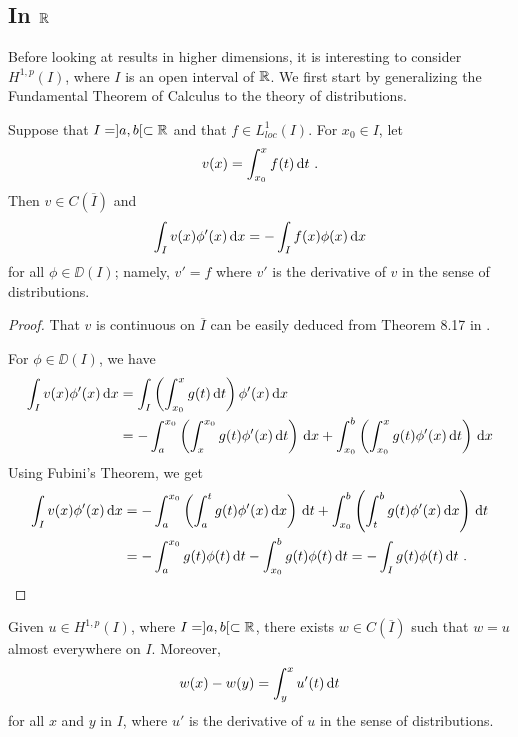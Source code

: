 \subsection{In $\mathbf{\mathbb{R}}$}

Before looking at results in higher dimensions, it is interesting to
consider $\displaystyle H^{1,p}(I)$, where $I$ is an open interval
of $\mathbb{R}$.  We first start by generalizing the
Fundamental Theorem of Calculus to the theory of distributions.

\begin{lemma} \label{sob_ftc}
Suppose that $I = ]a,b[ \subset \mathbb{R}$ and that
$\displaystyle f \in L^1_{loc}(I)$.  For $x_0 \in I$, let
\[
v(x) = \int_{x_0}^x f(t) \dx{t} \ .
\]
Then $v \in C(\overline{I})$ and
\[
\int_I v(x) \phi'(x) \,\mathrm{d}{x} = - \int _I f(x) \phi(x) \,\mathrm{d}{x}
\]
for all $\phi \in \DD(I)$; namely, $v' = f$ where $v'$ is the
derivative of $v$ in the sense of distributions.
\end{lemma}

\begin{proof}
That $v$ is continuous on $\overline{I}$ can be easily deduced from
Theorem 8.17 in \cite{Ru}.

For $\phi \in \DD(I)$, we have
\begin{align*}
\int_I v(x) \phi'(x) \,\mathrm{d}{x} &= \int_I \left( \int_{x_0}^x g(t)
  \,\mathrm{d}{t} \right) \phi'(x) \,\mathrm{d}{x} \\
&= -\int_a^{x_0} \left( \int_x^{x_0} g(t) \phi'(x) \,\mathrm{d}{t}\right) \,\mathrm{d}{x}
+ \int_{x_0}^b \left( \int_{x_0}^x g(t) \phi'(x) \,\mathrm{d}{t}\right) \,\mathrm{d}{x}
\end{align*}
Using Fubini's Theorem, we get
\begin{align*}
\int_I v(x) \phi'(x) \dx{x} &=
-\int_a^{x_0} \left( \int_a^t g(t) \phi'(x) \dx{x}\right) \dx{t}
+ \int_{x_0}^b \left( \int_t^b g(t) \phi'(x) \dx{x}\right) \dx{t} \\
&= -\int_a^{x_0} g(t) \phi(t) \dx{t}
- \int_{x_0}^b g(t) \phi(t) \dx{t} = - \int_I g(t) \phi(t) \dx{t} \ .  \qedhere
\end{align*}
\end{proof}

\begin{theorem} \label{sob_ader}
Given $\displaystyle u \in H^{1,p}(I)$, where $I = ]a,b[ \subset \mathbb{R}$,
there exists $w \in C(\overline{I})$ such that $w=u$ almost everywhere on $I$.
Moreover,
\[
w(x) - w(y) = \int_y^x u'(t) \,\mathrm{d}{t}
\]
for all $x$ and $y$ in $I$, where $u'$ is the derivative of $u$ in
the sense of distributions.
\end{theorem}

